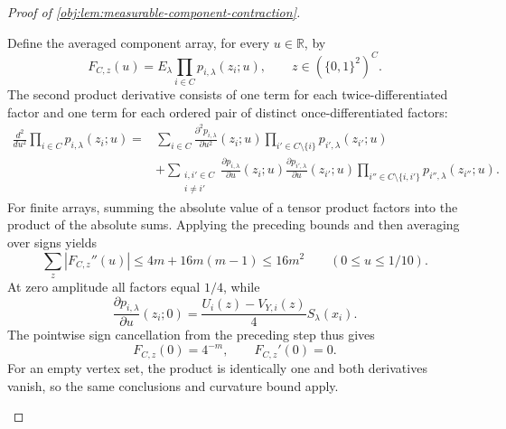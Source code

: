 \begin{proof}[Proof of \cref{obj:lem:measurable-component-contraction}]
\begin{enumerate}
Define the averaged component array, for every \(u\in\mathbb R\), by
\[
F_{C,z}(u)=E_\lambda\prod_{i\in C}p_{i,\lambda}(z_i;u),
\qquad
z\in(\{0,1\}^2)^C.
\]
The second product derivative consists of one term for each twice-differentiated factor and one term for each ordered pair of distinct once-differentiated factors:
\[
\begin{aligned}
\frac{d^2}{du^2}\prod_{i\in C}p_{i,\lambda}(z_i;u)
={}&
\sum_{i\in C}
 \frac{\partial^2p_{i,\lambda}}{\partial u^2}(z_i;u)
 \prod_{i'\in C\setminus\{i\}}p_{i',\lambda}(z_{i'};u)\\
&+
\sum_{\substack{i,i'\in C\\i\ne i'}}
 \frac{\partial p_{i,\lambda}}{\partial u}(z_i;u)
 \frac{\partial p_{i',\lambda}}{\partial u}(z_{i'};u)
 \prod_{i''\in C\setminus\{i,i'\}}p_{i'',\lambda}(z_{i''};u).
\end{aligned}
\]
For finite arrays, summing the absolute value of a tensor product factors into the product of the absolute sums. Applying the preceding bounds and then averaging over signs yields
\[
\sum_z|F_{C,z}''(u)|
\le4m+16m(m-1)
\le16m^2
\qquad(0\le u\le1/10).
\]
At zero amplitude all factors equal \(1/4\), while
\[
\frac{\partial p_{i,\lambda}}{\partial u}(z_i;0)
=
\frac{U_i(z)-V_{Y,i}(z)}4S_\lambda(x_i).
\]
The pointwise sign cancellation from the preceding step thus gives
\[
F_{C,z}(0)=4^{-m},
\qquad
F_{C,z}'(0)=0.
\]
For an empty vertex set, the product is identically one and both derivatives vanish, so the same conclusions and curvature bound apply.


\end{enumerate}
\end{proof}
